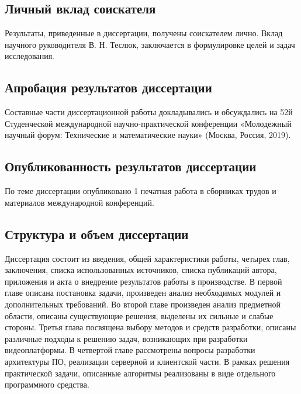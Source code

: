 \subsection*{Личный вклад соискателя}

Результаты, приведенные в диссертации, получены  соискателем лично.
Вклад научного руководителя В. Н. Теслюк, заключается в формулировке целей и задач исследования.

\subsection*{Апробация результатов диссертации}

Составные части диссертационной работы докладывались и обсуждались
на 52й Студенческой международной научно-практической конференции
«Молодежный научный форум: Технические и математические науки» (Москва, Россия, 2019).

\subsection*{Опубликованность результатов диссертации}

По теме диссертации опубликовано 1 печатная работа в сборниках трудов и материалов
международной конференций.


\subsection*{Структура и объем диссертации}

Диссертация состоит из введения, общей характеристики работы, четырех глав, заключения,
списка использованных источников, списка публикаций автора, приложения и акта о внедрение результатов
работы в производстве. В первой главе описана постановка задачи, произведен анализ необходимых
модулей и дополнительных требований. Во второй главе произведен анализ предметной области,
описаны существующие решения, выделены их сильные и слабые стороны.
Третья глава посвящена выбору методов и средств разработки, описаны различные подходы к
решению задач, возникающих при разработки видеоплатформы.
В четвертой главе рассмотрены вопросы разработки архитектуры ПО, реализации серверной и
клиентской части.
В рамках решения практической задачи, описанные алгоритмы реализованы в виде отдельного
программного средства.
